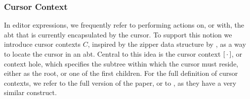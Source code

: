 \documentclass[sigplan,screen]{acmart}
\begin{document}
\subsubsection{Cursor Context}
In editor expressions, we frequently refer to performing actions on, or with, the abt that is currently encapsulated by the cursor. To support this notion we introduce cursor contexts $C$, inspired by the zipper data structure by \cite{huet_zipper}, as a way to locate the cursor in an abt. Central to this idea is the cursor context $[ \, \cdot \, ]$, or context hole, which specifies the subtree within which the cursor must reside, either as the root, or one of the first children.  For the full definition of cursor contexts, we refer to the full version of the paper, or to \cite{type_safe_structure_editor}, as they have a very similar construct.



\end{document}
